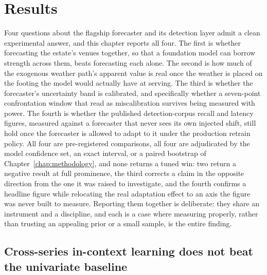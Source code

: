 
\chapter{Results}
\label{chap:results}

Four questions about the flagship forecaster and its detection layer admit a clean
experimental answer, and this chapter reports all four. The first is whether forecasting the
estate's venues together, so that a foundation model can borrow strength across them, beats
forecasting each alone. The second is how much of the exogenous weather path's apparent value
is real once the weather is placed on the footing the model would actually have at serving.
The third is whether the forecaster's uncertainty band is calibrated, and specifically whether
a seven-point confrontation window that read as miscalibration survives being measured with
power. The fourth is whether the published detection-corpus recall and latency figures, measured
against a forecaster that never sees its own injected shift, still hold once the forecaster is
allowed to adapt to it under the production retrain policy. All four are pre-registered
comparisons, all four are adjudicated by the model confidence set, an exact interval, or a paired
bootstrap of Chapter~\ref{chap:methodology}, and none returns a tuned win: two return a negative
result at full prominence, the third corrects a claim in the opposite direction from the one it
was raised to investigate, and the fourth confirms a headline figure while relocating the real
adaptation effect to an axis the figure was never built to measure. Reporting them together is
deliberate: they share an instrument and a discipline, and each is a case where measuring
properly, rather than trusting an appealing prior or a small sample, is the entire finding.

\section{Cross-series in-context learning does not beat the univariate baseline}
\label{sec:group-icl}

